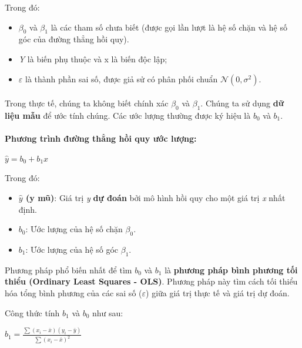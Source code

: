 Trong đó:

\begin{itemize}
    \item $\beta_0$ và $\beta_1$ là các tham số chưa biết (được gọi lần lượt là hệ số chặn và hệ số góc của đường thẳng hồi quy).
    \item \textit{Y} là biến phụ thuộc và x là biến độc lập;
    \item $\varepsilon$ là thành phần sai số, được giả sử có phân phối chuẩn $\mathcal{N}(0, \sigma^2)$.
\end{itemize}

\paragraph{}{Trong thực tế, chúng ta không biết chính xác $\beta_0$ và $\beta_1$. Chúng ta sử dụng \textbf{dữ liệu mẫu} để ước tính chúng. Các ước lượng thường được ký hiệu là \textbf{$b_0$} và \textbf{$b_1$}.}

\paragraph{}{\textbf{Phương trình đường thẳng hồi quy ước lượng:}}

\begin{center}
\large $\hat{y} = b_0 + b_1x$
\end{center}

Trong đó:

\begin{itemize}
    \item \textbf{$\hat{y}$ (y mũ)}: Giá trị \textit{y} \textbf{dự đoán} bởi mô hình hồi quy cho một giá trị \textit{x} nhất định.
    \item \textbf{$b_0$}: Ước lượng của hệ số chặn $\beta_0$.
    \item \textbf{$b_1$}: Ước lượng của hệ số góc $\beta_1$.
\end{itemize}


Phương pháp phổ biến nhất để tìm $b_0$ và $b_1$ là \textbf{phương pháp bình phương tối thiểu (Ordinary Least Squares - OLS)}. Phương pháp này tìm cách tối thiểu hóa tổng bình phương của các sai số ($\varepsilon$) giữa giá trị thực tế và giá trị dự đoán.

Công thức tính $b_1$ và $b_0$ như sau:

\begin{center}
\large $b_1 = \frac{\sum(x_i - \bar{x})(y_i - \bar{y})}{\sum(x_i - \bar{x})^2}$
\end{center}

